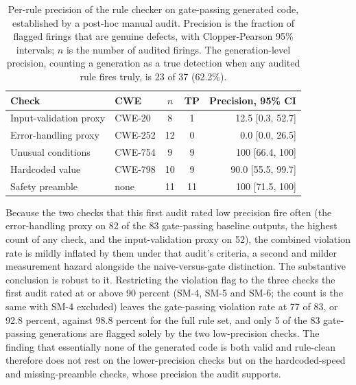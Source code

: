 \documentclass{ieeeaccess}
\begin{document}
\begin{table}[h]
\setlength{\tabcolsep}{4pt}
\caption{Per-rule precision of the rule checker on gate-passing generated code,
established by a post-hoc manual audit. Precision is the fraction of flagged firings
that are genuine defects, with Clopper-Pearson 95\% intervals; $n$ is the number of
audited firings. The generation-level precision, counting a generation as a true
detection when any audited rule fires truly, is 23 of 37 (62.2\%).}
\label{tab:precision}
\centering
\footnotesize
\begin{tabular}{@{}p{}lccr@{}}
\toprule
Check & CWE & $n$ & TP & Precision, 95\% CI \\
\midrule
Input-validation proxy & CWE-20 & 8 & 1 & 12.5 [0.3, 52.7] \\
Error-handling proxy & CWE-252 & 12 & 0 & 0.0 [0.0, 26.5] \\
Unusual conditions & CWE-754 & 9 & 9 & 100 [66.4, 100] \\
Hardcoded value & CWE-798 & 10 & 9 & 90.0 [55.5, 99.7] \\
Safety preamble & none & 11 & 11 & 100 [71.5, 100] \\
\bottomrule
\end{tabular}
\end{table}

Because the two checks that this first audit rated low precision fire often (the
error-handling proxy on 82 of the 83 gate-passing baseline outputs, the highest count of
any check, and the input-validation proxy on 52), the combined violation rate is mildly inflated by them under that
audit's criteria, a second and milder measurement hazard alongside the
naive-versus-gate distinction. The substantive conclusion is robust to it. Restricting
the violation flag to the three checks the first audit rated at or above 90 percent
(SM-4, SM-5 and SM-6; the count is the same with SM-4 excluded) leaves the gate-passing
violation rate at 77 of 83, or 92.8 percent, against 98.8 percent for the full rule set,
and only 5 of the 83 gate-passing generations are flagged solely by the two
low-precision checks. The finding that essentially none of the generated code is
both valid and rule-clean therefore does not rest on the lower-precision checks but on
the hardcoded-speed and missing-preamble checks, whose precision the audit supports.
\end{document}
